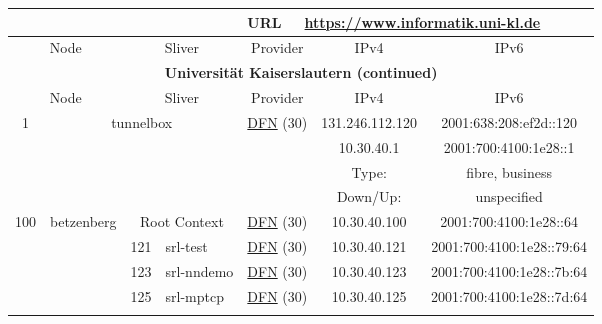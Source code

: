 \begin{small}
\begin{center}
\begin{longtable}{|c|c|c|c|c|c|c|c|}
 \multicolumn{4}{|c|}{} & \multicolumn{1}{|l|}{URL} & \multicolumn{3}{|l|}{\url{https://www.informatik.uni-kl.de}} \\ \hline
 \multicolumn{2}{|p{8em}|}{Node} & \multicolumn{2}{|p{8em}|}{Sliver} & \multicolumn{2}{|p{8em}|}{Provider} & IPv4 & IPv6 \\ \hline
\endfirsthead
\hline
 \multicolumn{8}{|c|}{\textbf{Universität Kaiserslautern (continued)}} \\ \hline
 \multicolumn{2}{|p{8em}|}{Node} & \multicolumn{2}{|p{8em}|}{Sliver} & \multicolumn{2}{|p{8em}|}{Provider} & IPv4 & IPv6 \\ \hline
\endhead
 \multirow{4}{*}{\tiny{1}} & \multicolumn{3}{|c|}{\multirow{4}{*}{\tiny{tunnelbox}}} & \multicolumn{2}{|c|}{\multirow{4}{*}{\tiny{\href{https://www.dfn.de}{DFN} (30)}}} & \tiny{131.246.112.120} & \tiny{2001:638:208:ef2d::120} \\* \cline{7-7}\cline{8-8}
  & \multicolumn{3}{|c|}{} & \multicolumn{2}{|c|}{} & \tiny{10.30.40.1} & \tiny{2001:700:4100:1e28::1} \\* \cline{7-7}\cline{8-8}
  & \multicolumn{3}{|c|}{} & \multicolumn{2}{|c|}{} & Type: & fibre, business \\* \cline{7-7}\cline{8-8}
  & \multicolumn{3}{|c|}{} & \multicolumn{2}{|c|}{} & Down/Up:  & unspecified \\ \hline
 \multirow{17}{*}{\tiny{100}} & \multicolumn{1}{|l|}{\multirow{17}{*}{\tiny{betzenberg}}} & \multicolumn{2}{|c|}{\tiny{Root Context}} & \multicolumn{2}{|c|}{\tiny{\href{https://www.dfn.de}{DFN} (30)}} & \tiny{10.30.40.100} & \tiny{2001:700:4100:1e28::64} \\* \cline{3-3}\cline{4-4}\cline{5-5}\cline{6-6}\cline{7-7}\cline{8-8}
  &  & \tiny{121} & \multicolumn{1}{|l|}{\tiny{srl-test}} & \multicolumn{2}{|c|}{\tiny{\href{https://www.dfn.de}{DFN} (30)}} & \tiny{10.30.40.121} & \tiny{2001:700:4100:1e28::79:64} \\* \cline{3-3}\cline{4-4}\cline{5-5}\cline{6-6}\cline{7-7}\cline{8-8}
  &  & \tiny{123} & \multicolumn{1}{|l|}{\tiny{srl-nndemo}} & \multicolumn{2}{|c|}{\tiny{\href{https://www.dfn.de}{DFN} (30)}} & \tiny{10.30.40.123} & \tiny{2001:700:4100:1e28::7b:64} \\* \cline{3-3}\cline{4-4}\cline{5-5}\cline{6-6}\cline{7-7}\cline{8-8}
  &  & \tiny{125} & \multicolumn{1}{|l|}{\tiny{srl-mptcp}} & \multicolumn{2}{|c|}{\tiny{\href{https://www.dfn.de}{DFN} (30)}} & \tiny{10.30.40.125} & \tiny{2001:700:4100:1e28::7d:64} \\* \cline{3-3}\cline{4-4}\cline{5-5}\cline{6-6}\cline{7-7}\cline{8-8}

\end{longtable}
\end{center}
\end{small}

